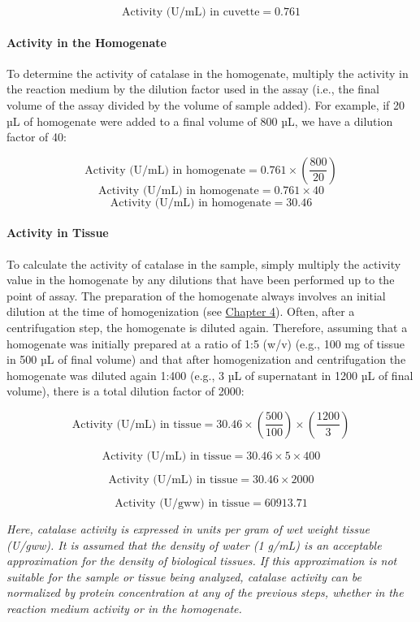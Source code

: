 \documentclass[
  9pt,
  american,
  a5paper,
  extrafontsizes,onecolumn,openright
  ]{memoir}
\newlength{\rf}
\begin{document}
\[ \text{Activity (U/mL) in cuvette} = 0.761\]

\paragraph{Activity in the Homogenate}\label{activity-in-the-homogenate}

To determine the activity of catalase in the homogenate, multiply the activity in the reaction medium by the dilution factor used in the assay (i.e., the final volume of the assay divided by the volume of sample added). For example, if 20 µL of homogenate were added to a final volume of 800 µL, we have a dilution factor of 40:

\[ \text{Activity (U/mL) in homogenate} = 0.761 \times \left( \frac{800}{20} \right)\]
\[ \text{Activity (U/mL) in homogenate} = 0.761 \times 40\]
\[ \text{Activity (U/mL) in homogenate} = 30.46 \]

\paragraph{Activity in Tissue}\label{activity-in-tissue}

To calculate the activity of catalase in the sample, simply multiply the activity value in the homogenate by any dilutions that have been performed up to the point of assay. The preparation of the homogenate always involves an initial dilution at the time of homogenization (see \hyperref[chapter4]{Chapter 4}). Often, after a centrifugation step, the homogenate is diluted again. Therefore, assuming that a homogenate was initially prepared at a ratio of 1:5 (w/v) (e.g., 100 mg of tissue in 500 µL of final volume) and that after homogenization and centrifugation the homogenate was diluted again 1:400 (e.g., 3 µL of supernatant in 1200 µL of final volume), there is a total dilution factor of 2000:

\[ \text{Activity (U/mL) in tissue} = 30.46 \times \left( \frac{500}{100} \right) \times \left( \frac{1200}{3} \right)\]

\[ \text{Activity (U/mL) in tissue} = 30.46 \times 5 \times 400\]

\[ \text{Activity (U/mL) in tissue} = 30.46 \times 2000\]

\[ \text{Activity (U/gww) in tissue} = 60913.71\]

\begin{greybox}[frametitle = Note]
\emph{Here, catalase activity is expressed in units per gram of wet weight tissue (U/gww). It is assumed that the density of water (1 g/mL) is an acceptable approximation for the density of biological tissues. If this approximation is not suitable for the sample or tissue being analyzed, catalase activity can be normalized by protein concentration at any of the previous steps, whether in the reaction medium activity or in the homogenate.}

\end{greybox}
\end{document}
